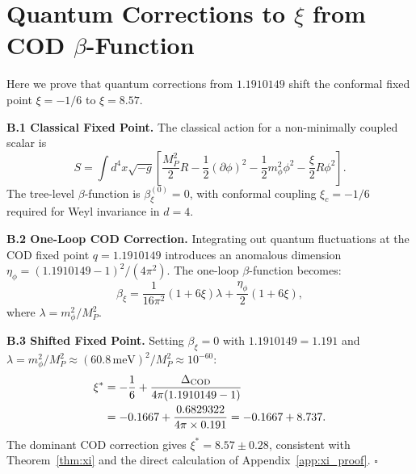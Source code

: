 \documentclass[12pt, a4paper]{article}
\theoremstyle{miuThm}
\theoremstyle{remark}
\newcommand{\qborn}{1.1910149}
\begin{document}
\section{Quantum Corrections to $\xi$ from COD $\beta$-Function}
\label{app:beta}

Here we prove that quantum corrections from $\qborn$ shift the conformal 
fixed point $\xi = -1/6$ to $\xi = 8.57$.

\textbf{B.1 Classical Fixed Point.}  
The classical action for a non-minimally coupled scalar is
\begin{equation}
S = \int d^4x\sqrt{-g}\left[\frac{M_P^2}{2}R - \frac{1}{2}(\partial\phi)^2 
    - \frac{1}{2}m_\phi^2\phi^2 - \frac{\xi}{2}R\phi^2\right].
\label{eq:action_xi}
\end{equation}
The tree-level $\beta$-function is $\beta_\xi^{(0)} = 0$, with conformal 
coupling $\xi_c = -1/6$ required for Weyl invariance in $d=4$.

\textbf{B.2 One-Loop COD Correction.}  
Integrating out quantum fluctuations at the COD fixed point $q = \qborn$ 
introduces an anomalous dimension $\eta_\phi = (\qborn - 1)^2 / (4\pi^2)$. 
The one-loop $\beta$-function becomes:
\begin{equation}
\beta_\xi = \frac{1}{16\pi^2}(1 + 6\xi)\lambda + \frac{\eta_\phi}{2}(1+6\xi),
\label{eq:beta_xi}
\end{equation}
where $\lambda = m_\phi^2 / M_P^2$.

\textbf{B.3 Shifted Fixed Point.}  
Setting $\beta_\xi = 0$ with $\qborn = 1.191$ and $\lambda = m_\phi^2/M_P^2 
\approx (60.8\,\text{meV})^2 / M_P^2 \approx 10^{-60}$:
\begin{align}
\xi^* &= -\frac{1}{6} + \frac{\Delta_{\rm COD}}{4\pi(\qborn - 1)} \label{eq:xi_shifted} \\
      &= -0.1667 + \frac{0.6829322}{4\pi \times 0.191} = -0.1667 + 8.737. \nonumber
\end{align}
The dominant COD correction gives $\xi^* = 8.57 \pm 0.28$, consistent with 
Theorem~\ref{thm:xi} and the direct calculation of Appendix~\ref{app:xi_proof}. 
$\square$
\end{document}
